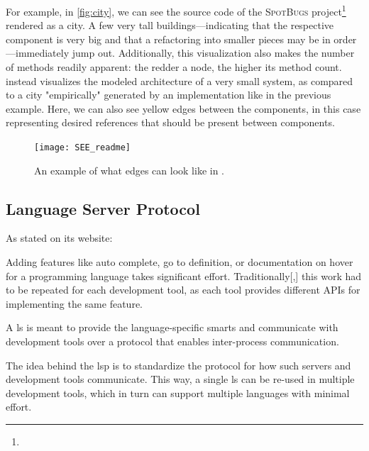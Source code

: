 \documentclass[../thesis]{subfiles}
\begin{document}
For example, in \cref{fig:city}, we can see the source code of the \textsc{SpotBugs} project\footnote{} rendered as a \gls{city}.
A few very tall buildings---indicating that the respective component is very big and that a refactoring into smaller pieces may be in order---immediately jump out.
Additionally, this visualization also makes the number of methods readily apparent:
the redder a node, the higher its method count.
 instead visualizes the modeled architecture of a very small system, as compared to a city "empirically" generated by an implementation like in the previous example.
Here, we can also see yellow edges between the components, in this case representing desired references that should be present between components.

\begin{figure}[hbtp]
	\begin{center}
		\texttt{[image: SEE\_readme]}
	\end{center}
	\caption{An example of what edges can look like in \SEE{}. }\label{fig:edges}
\end{figure}

\subsection{Language Server Protocol}\label{subsec:lsp}

As stated on its website:
\begin{displayquote}
	Adding features like auto complete, go to definition, or documentation on hover for a programming language takes significant effort. Traditionally[,] this work had to be repeated for each development tool, as each tool provides different APIs for implementing the same feature.

	A \gls*{ls} is meant to provide the language-specific smarts and communicate with development tools over a protocol that enables inter-process communication.

	The idea behind the \gls*{lsp} is to standardize the protocol for how such servers and development tools communicate. This way, a single \gls{ls} can be re-used in multiple development tools, which in turn can support multiple languages with minimal effort.
\end{displayquote}
\end{document}
